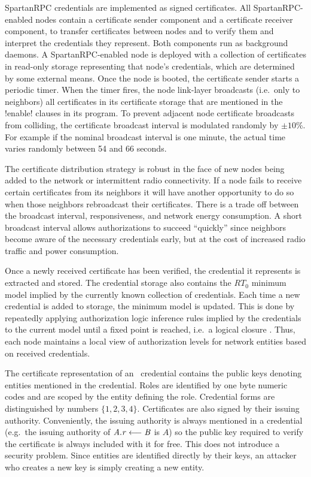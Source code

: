SpartanRPC credentials are implemented as signed certificates. All SpartanRPC-enabled nodes
contain a certificate sender component and a certificate receiver component, to transfer
certificates between nodes and to verify them and interpret the credentials they represent. Both
components run as background daemons. A SpartanRPC-enabled node is deployed with a collection of
certificates in read-only storage representing that node's credentials, which are determined by
some external means. Once the node is booted, the certificate sender starts a periodic timer.
When the timer fires, the node link-layer broadcasts (i.e.~only to neighbors) all certificates
in its certificate storage that are mentioned in the !enable! clauses in its program. To prevent
adjacent node certificate broadcasts from colliding, the certificate broadcast interval is
modulated randomly by $\pm 10$\%. For example if the nominal broadcast interval is one minute,
the actual time varies randomly between 54 and 66 seconds.

The certificate distribution strategy is robust in the face of new nodes being added to the
network or intermittent radio connectivity. If a node fails to receive certain certificates from
its neighbors it will have another opportunity to do so when those neighbors rebroadcast their
certificates. There is a trade off between the broadcast interval, responsiveness, and network
energy consumption. A short broadcast interval allows authorizations to succeed ``quickly''
since neighbors become aware of the necessary credentials early, but at the cost of increased
radio traffic and power consumption.

Once a newly received certificate has been verified, the credential it represents is extracted
and stored. The credential storage also contains the $RT_0$ minimum model implied by the
currently known collection of credentials. Each time a new credential is added to storage, the
minimum model is updated. This is done by repeatedly applying authorization logic inference
rules implied by the credentials to the current model until a fixed point is reached, i.e.~a
logical closure \cite{Li:DCFTML}. Thus, each node maintains a local view of authorization levels
for network entities based on received credentials.

The certificate representation of an \RT\ credential contains the public keys denoting entities
mentioned in the credential. Roles are identified by one byte numeric codes and are scoped by
the entity defining the role. Credential forms are distinguished by numbers $\{ 1, 2, 3, 4 \}$.
Certificates are also signed by their issuing authority. Conveniently, the issuing authority is
always mentioned in a credential (e.g.~the issuing authority of $\mathit{A.r} \stackrel{}{\longleftarrow} \mathit{B}$ is $A$) so the
public key required to verify the certificate is always included with it for free. This does not
introduce a security problem. Since entities are identified directly by their keys, an attacker
who creates a new key is simply creating a new entity.


